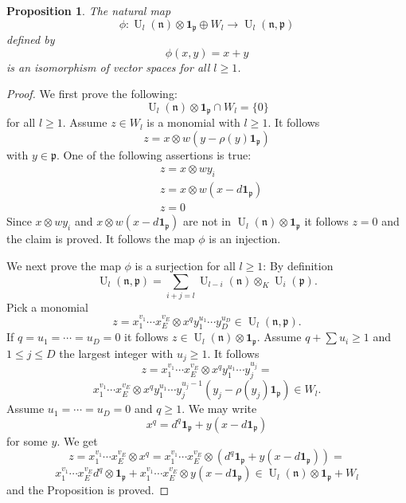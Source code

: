 \documentclass{amsart}
\theoremstyle{plain}
\newtheorem{proposition}[theorem]{Proposition}
\theoremstyle{definition}
\theoremstyle{remark}
\numberwithin{equation}{theorem}
\begin{document}
\begin{proposition} \label{injective} The natural map
\[ \phi:{\operatorname{U}}_l({\mathfrak{n}})\otimes {\mathbf{1}_{\mathfrak{p}}} \oplus W_l \rightarrow {\operatorname{U}}_l({\mathfrak{n}},{\mathfrak{p}}) \]
defined by
\[ \phi(x,y)=x+y \]
is an isomorphism of vector spaces for all $l\geq 1$.
\end{proposition}
\begin{proof} 
We first prove the following:
\[ {\operatorname{U}}_l({\mathfrak{n}})\otimes {\mathbf{1}_{\mathfrak{p}}} \cap W_l=\{0\} \]
for all $l\geq 1$.
Assume $z\in W_l$ is a monomial with $l\geq 1$. It follows
\[ z=x\otimes w(y-\rho(y){\mathbf{1}_{\mathfrak{p}}}) \]
with $y\in {\mathfrak{p}}$. One of the following assertions is true:
\begin{align}
&\label{a1} z=x\otimes w y_i  \\
& \label{a2} z=x\otimes w(x-d{\mathbf{1}_{\mathfrak{p}}}) \\
& \label{a3} z=0
\end{align}
Since $x\otimes w y_i$ and $x\otimes w(x-d{\mathbf{1}_{\mathfrak{p}}})$ are not in
${\operatorname{U}}_l({\mathfrak{n}})\otimes {\mathbf{1}_{\mathfrak{p}}}$ it follows $z=0$ and the claim is proved.
It follows the map $\phi$ is an injection.

We next prove the map $\phi$ is a surjection for all $l\geq 1$:
By definition
\[ {\operatorname{U}}_l({\mathfrak{n}},{\mathfrak{p}})=\sum_{i+j=l}{\operatorname{U}}_{l-i}({\mathfrak{n}})\otimes_K {\operatorname{U}}_i({\mathfrak{p}}) .\]
Pick a monomial
\[z=x_1^{v_1}\cdots x_E^{v_E}\otimes x^qy_1^{u_1}\cdots y_D^{u_D}\in {\operatorname{U}}_l({\mathfrak{n}},{\mathfrak{p}}) .\]
If $q=u_1=\cdots =u_D=0$ it follows $z\in {\operatorname{U}}_l({\mathfrak{n}})\otimes
{\mathbf{1}_{\mathfrak{p}}}$. Assume
$q+\sum u_i \geq 1$ and $1\leq j \leq D$ the largest integer with
$u_j\geq 1$. It follows
\[ z=x_1^{v_1}\cdots x_E^{v_E}\otimes x^qy_1^{u_1}\cdots y_j^{u_j}=\]
\[ x_1^{v_1}\cdots x_E^{v_E}\otimes x^qy_1^{u_1}\cdots y_j^{u_j-1}(y_j-\rho(y_j){\mathbf{1}_{\mathfrak{p}}})\in W_l.\]
Assume $u_1=\cdots =u_D=0$ and $q\geq 1$. We may write
\[ x^q=d^q{\mathbf{1}_{\mathfrak{p}}} +y(x-d{\mathbf{1}_{\mathfrak{p}}}) \]
for some $y$. We get
\[ z= x_1^{v_1}\cdots x_E^{v_E}\otimes x^q= x_1^{v_1}\cdots
x_E^{v_E}\otimes (d^q{\mathbf{1}_{\mathfrak{p}}} +y(x-d{\mathbf{1}_{\mathfrak{p}}}))=\]
\[x_1^{v_1}\cdots x_E^{v_E}d^q\otimes {\mathbf{1}_{\mathfrak{p}}}+x_1^{v_1}\cdots
x_E^{v_E}\otimes y(x-d{\mathbf{1}_{\mathfrak{p}}})\in {\operatorname{U}}_l({\mathfrak{n}})\otimes {\mathbf{1}_{\mathfrak{p}}} +W_l \]
and the Proposition is proved.
\end{proof}
\end{document}
